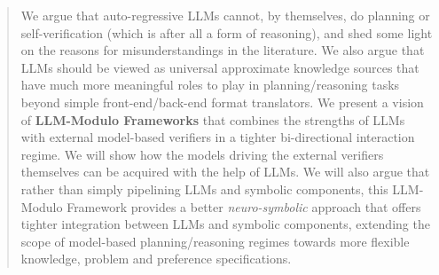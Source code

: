 \documentclass{article}
\newcommand{\rao}[1]{\noindent\textcolor{red}{#1}}
\theoremstyle{plain}
\theoremstyle{definition}
\theoremstyle{remark}
\begin{document}
\begin{abstract}
We argue that auto-regressive LLMs cannot, by themselves, do planning or self-verification (which is after all a form of reasoning), and shed some light on the reasons for misunderstandings in the literature. We also argue that LLMs should be viewed as universal approximate knowledge sources that have much more meaningful roles to play in planning/reasoning tasks beyond simple front-end/back-end format translators. We present a vision of {\bf LLM-Modulo Frameworks} that combines the strengths of LLMs with external model-based verifiers in a tighter bi-directional interaction regime. We will show how the models driving the external verifiers themselves can be acquired with the help of LLMs. We will also argue that rather than simply pipelining LLMs and symbolic components, this LLM-Modulo Framework provides a  better \textit{neuro-symbolic} approach that offers tighter integration between LLMs and symbolic components, extending the scope of model-based planning/reasoning regimes towards more flexible knowledge, problem and preference specifications. 



\end{abstract}
\end{document}
